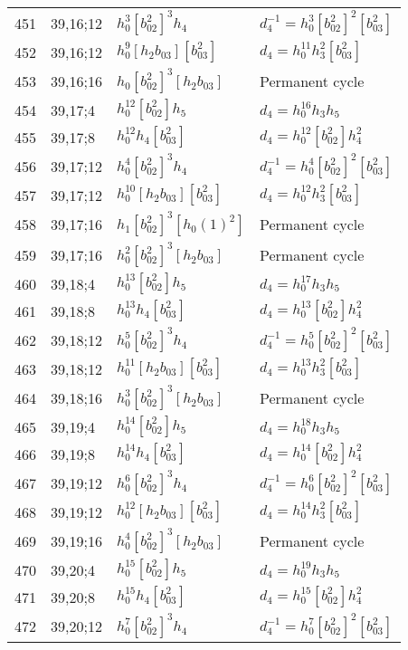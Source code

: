 \documentclass{article}
\begin{document}
\begin{longtable}{|l|l|>{\raggedright\arraybackslash}p{6cm}|>{\raggedright\arraybackslash}p{6cm}|}
\hline
451 & 39,16;12 & $h_0^3[b_{02}^2]^3h_4$ & $d_{4}^{-1}=h_0^3[b_{02}^2]^2[b_{03}^2]$\\
452 & 39,16;12 & $h_0^9[h_2b_{03}][b_{03}^2]$ &$d_{4}=h_0^{11}h_3^2[b_{03}^2]$\\
\hline
453 & 39,16;16 & $h_0[b_{02}^2]^3[h_2b_{03}]$ & Permanent cycle\\
\hline
454 & 39,17;4 & $h_0^{12}[b_{02}^2]h_5$ &$d_{4}=h_0^{16}h_3h_5$\\
\hline
455 & 39,17;8 & $h_0^{12}h_4[b_{03}^2]$ &$d_{4}=h_0^{12}[b_{02}^2]h_4^2$\\
\hline
456 & 39,17;12 & $h_0^4[b_{02}^2]^3h_4$ & $d_{4}^{-1}=h_0^4[b_{02}^2]^2[b_{03}^2]$\\
457 & 39,17;12 & $h_0^{10}[h_2b_{03}][b_{03}^2]$ &$d_{4}=h_0^{12}h_3^2[b_{03}^2]$\\
\hline
458 & 39,17;16 & $h_1[b_{02}^2]^3[h_0(1)^2]$ & Permanent cycle\\
459 & 39,17;16 & $h_0^2[b_{02}^2]^3[h_2b_{03}]$ & Permanent cycle\\
\hline
460 & 39,18;4 & $h_0^{13}[b_{02}^2]h_5$ &$d_{4}=h_0^{17}h_3h_5$\\
\hline
461 & 39,18;8 & $h_0^{13}h_4[b_{03}^2]$ &$d_{4}=h_0^{13}[b_{02}^2]h_4^2$\\
\hline
462 & 39,18;12 & $h_0^5[b_{02}^2]^3h_4$ & $d_{4}^{-1}=h_0^5[b_{02}^2]^2[b_{03}^2]$\\
463 & 39,18;12 & $h_0^{11}[h_2b_{03}][b_{03}^2]$ &$d_{4}=h_0^{13}h_3^2[b_{03}^2]$\\
\hline
464 & 39,18;16 & $h_0^3[b_{02}^2]^3[h_2b_{03}]$ & Permanent cycle\\
\hline
465 & 39,19;4 & $h_0^{14}[b_{02}^2]h_5$ &$d_{4}=h_0^{18}h_3h_5$\\
\hline
466 & 39,19;8 & $h_0^{14}h_4[b_{03}^2]$ &$d_{4}=h_0^{14}[b_{02}^2]h_4^2$\\
\hline
467 & 39,19;12 & $h_0^6[b_{02}^2]^3h_4$ & $d_{4}^{-1}=h_0^6[b_{02}^2]^2[b_{03}^2]$\\
468 & 39,19;12 & $h_0^{12}[h_2b_{03}][b_{03}^2]$ &$d_{4}=h_0^{14}h_3^2[b_{03}^2]$\\
\hline
469 & 39,19;16 & $h_0^4[b_{02}^2]^3[h_2b_{03}]$ & Permanent cycle\\
\hline
470 & 39,20;4 & $h_0^{15}[b_{02}^2]h_5$ &$d_{4}=h_0^{19}h_3h_5$\\
\hline
471 & 39,20;8 & $h_0^{15}h_4[b_{03}^2]$ &$d_{4}=h_0^{15}[b_{02}^2]h_4^2$\\
\hline
472 & 39,20;12 & $h_0^7[b_{02}^2]^3h_4$ & $d_{4}^{-1}=h_0^7[b_{02}^2]^2[b_{03}^2]$\\

\end{longtable}
\end{document}
